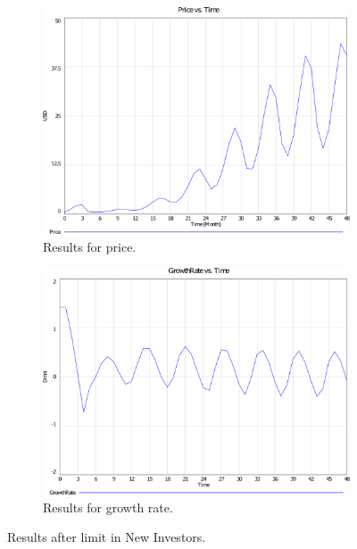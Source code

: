     \begin{figure}[H]
      \centering
      \begin{subfigure}[t]{0.4\textwidth}
        \includegraphics[scale = 0.3]{files/politInvPrice.pdf}
        \centering
        \caption{Results for price.}
      \end{subfigure}
      \hspace{1cm}
      \begin{subfigure}[t]{0.4\textwidth}
        \includegraphics[scale = 0.3]{files/politInvGrowth.pdf}
        \centering
        \caption{Results for growth rate.}
      \end{subfigure}
      \caption{Results after limit in New Investors.}
      \label{img:politinv}
	\end{figure}
